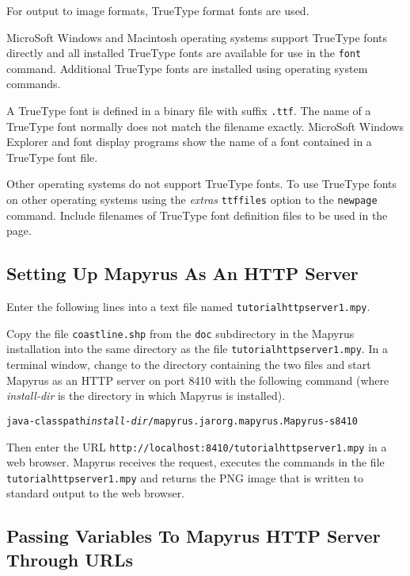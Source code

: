 For output to image formats, TrueType format fonts are used.

MicroSoft Windows and Macintosh operating systems support TrueType
fonts directly and all installed TrueType fonts are available
for use in the \texttt{font} command.
Additional TrueType fonts are installed using operating system commands.

A TrueType font is defined in a binary file with suffix
\texttt{.ttf}.
The name of a TrueType font normally does not match the filename exactly.
MicroSoft Windows Explorer and font display programs show the name of
a font contained in a TrueType font file.

Other operating systems do not support TrueType fonts.  To use TrueType fonts
on other operating systems using the \textit{extras} \texttt{ttffiles} option
to the \texttt{newpage} command.  Include filenames of TrueType font definition
files to be used in the page.

\subsection{Setting Up Mapyrus As An HTTP Server}

Enter the following lines into a text file named
\texttt{tutorialhttpserver1.mpy}.



Copy the file \texttt{coastline.shp} from the \texttt{doc} subdirectory in the
Mapyrus installation into the same directory as the file
\texttt{tutorialhttpserver1.mpy}.  In a terminal window, change to the
directory containing the two files and start Mapyrus as an HTTP server on port
8410 with the following command
(where \textit{install-dir} is the directory in which Mapyrus is installed).

\begin{alltt}
java -classpath \textit{install-dir}/mapyrus.jar org.mapyrus.Mapyrus -s 8410
\end{alltt}

Then enter the URL \texttt{http://localhost:8410/tutorialhttpserver1.mpy} in a
web browser.  Mapyrus receives the request, executes the commands in the file
\texttt{tutorialhttpserver1.mpy} and returns the PNG image that is written to
standard output to the web browser.

\subsection{Passing Variables To Mapyrus HTTP Server Through URLs}

